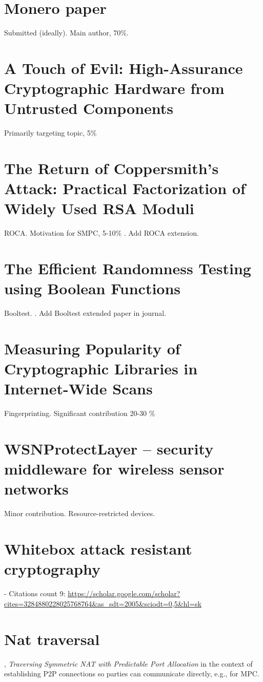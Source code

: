 \documentclass[
  digital, %
  twoside, %
  table,   %
  lof,     %
  lot,     %
]{fithesis3}
\theoremstyle{definition}
\theoremstyle{remark}
\begin{document}
\begin{ecmmnt} %
\section{Monero paper}
Submitted (ideally). Main author, 70\%.

\section{A Touch of Evil: High-Assurance Cryptographic Hardware from Untrusted Components}
Primarily targeting topic, 5\% \cite{2017-ccs-mavroudis}

\section{The Return of Coppersmith's Attack: Practical Factorization of Widely Used RSA Moduli}
ROCA. Motivation for SMPC, 5-10\% \cite{2017-ccs-nemec}.
Add ROCA extension.

\section{The Efficient Randomness Testing using Boolean Functions}
Booltest. \cite{booltest_secrypt2017}.
Add Booltest extended paper in journal.

\section{Measuring Popularity of Cryptographic Libraries in Internet-Wide Scans}
Fingerprinting. Significant contribution 20-30 \% \cite{2017-acsac-nemec}

\section{WSNProtectLayer – security middleware for wireless sensor networks}
Minor contribution. Resource-restricted devices. \cite{wsnprotectlayer}

\section{Whitebox attack resistant cryptography}
\cite{whitebox_klinec_santacrypt2013, Klinec2013thesis} 

- Citations count 9: \url{https://scholar.google.com/scholar?cites=3284880228025768764&as_sdt=2005&sciodt=0,5&hl=sk}

\section{Nat traversal}
\cite{Klinec:2014:TSN:2659651.2659698},
\emph{Traversing Symmetric NAT with Predictable Port Allocation} in the context of establishing P2P connections so parties can communicate directly, e.g., for MPC.



\end{ecmmnt}
\end{document}
